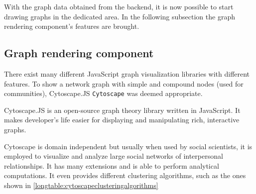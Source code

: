 With the graph data obtained from the backend, it is now possible to start drawing graphs in the dedicated area.
In the following subsection the graph rendering component's features are brought.

\subsection{Graph rendering component} \label{subsection:ImplementingtheWebApp/Thefrontend/Graphrenderingcomponent}
There exist many different JavaScript graph visualization libraries with different features.
To show a network graph with simple and compound nodes (used for communities), \gls{Cytoscape.JS} \texttt{\gls{Cytoscape}} was deemed appropriate.
\medskip

\gls{Cytoscape.JS} is an open-source graph theory library written in JavaScript.
It makes developer's life easier for displaying and manipulating rich, interactive graphs.

\gls{Cytoscape} is domain independent but usually when used by social scientists, it is employed to visualize and analyze large social networks of interpersonal relationships.
It has many extensions and is able to perform analytical computations.
It even provides different clustering algorithms, such as the ones shown in \hyperref[longtable:cytoscapeclusteringalgorithms]{\autoref{longtable:cytoscapeclusteringalgorithms}}

